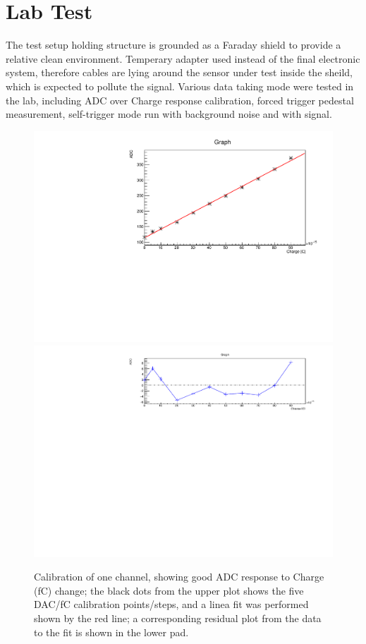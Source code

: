 \documentclass[conference]{IEEEtran}
\begin{document}
\section{Lab Test}
The test setup holding structure is grounded as a Faraday shield to provide a relative clean environment.
Temperary adapter used instead of the final electronic system, therefore cables are lying around the sensor under test inside the sheild, which is expected to pollute the signal.
Various data taking mode were tested in the lab, including ADC over Charge response calibration, forced trigger pedestal measurement, self-trigger mode run with background noise and with signal.
\begin{figure}[!ht]%
  \centering
\includegraphics[width=0.6\linewidth]{pics/calib_example.pdf}
\includegraphics[width=0.6\linewidth]{pics/resid_example.pdf}
  \caption{Calibration of one channel, showing good ADC response to Charge (fC) change;
  the black dots from the upper plot shows the five DAC/fC calibration points/steps, and a linea fit was performed shown by the red line;
  a corresponding residual plot from the data to the fit is shown in the lower pad.}%
\label{fig:lab1}%
\end{figure}
\end{document}
